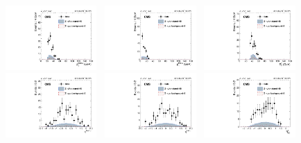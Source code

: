 		\begin{figure}[h]
		  \centering
		  \includegraphics[width=0.31\textwidth]{Fig/Final_NoPreliminary/ZJpsiG/leadingMuonPt_EBHR9}~
		  \includegraphics[width=0.31\textwidth]{Fig/Final_NoPreliminary/ZJpsiG/trailingMuonPt_EBHR9}~
		  \includegraphics[width=0.31\textwidth]{Fig/Final_NoPreliminary/ZJpsiG/phoPt_EBHR9}\\
		  \includegraphics[width=0.31\textwidth]{Fig/Final_NoPreliminary/ZJpsiG/leadingMuonEta_EBHR9}~
		  \includegraphics[width=0.31\textwidth]{Fig/Final_NoPreliminary/ZJpsiG/trailingMuonEta_EBHR9}~
		  \includegraphics[width=0.31\textwidth]{Fig/Final_NoPreliminary/ZJpsiG/phoSCEta_EBHR9}\\

\end{figure}

